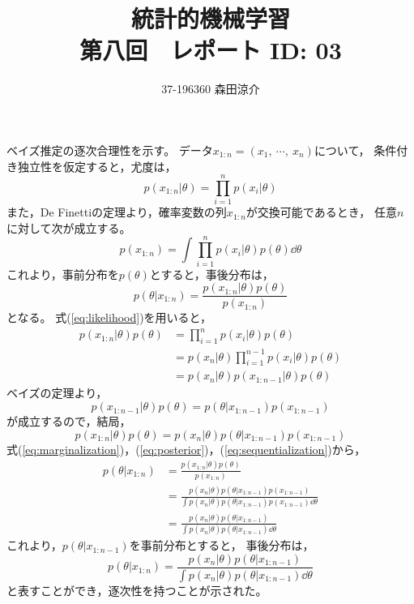 \documentclass[dvipdfmx, fleqn]{jsarticle}
\title{
	統計的機械学習 \\
    第八回　レポート ID: 03
    }
\author{37-196360 \quad 森田涼介}
\begin{document}
\maketitle

ベイズ推定の逐次合理性を示す。
データ\(x_{1:n} = (x_1,\ \cdots,\ x_n)\)について，
条件付き独立性を仮定すると，尤度は，
\begin{equation}
    p(x_{1:n}|\theta) = \prod_{i=1}^{n} p(x_i | \theta)
    \label{eq:likelihood}
\end{equation}
また，De Finettiの定理より，確率変数の列\(x_{1:n}\)が交換可能であるとき，
任意\(n\)に対して次が成立する。
\begin{equation}
    p(x_{1:n}) = \int \prod_{i=1}^{n} p(x_i | \theta) p(\theta) \dd\theta
    \label{eq:marginalization}
\end{equation}
これより，事前分布を\(p(\theta)\)とすると，事後分布は，
\begin{equation}
    p(\theta|x_{1:n}) = \frac{p(x_{1:n} | \theta) p(\theta)}{p(x_{1:n})}
    \label{eq:posterior}
\end{equation}
となる。
式(\ref{eq:likelihood})を用いると，
\begin{align*}
    p(x_{1:n} | \theta) p(\theta)
        & = \prod_{i=1}^{n} p(x_i | \theta) p(\theta) \\
        & = p(x_n | \theta) \prod_{i=1}^{n-1} p(x_i | \theta) p(\theta) \\
        & = p(x_n | \theta) p(x_{1:n-1} | \theta) p(\theta)
\end{align*}
ベイズの定理より，
\begin{equation*}
    p(x_{1:n-1} | \theta) p(\theta) = p(\theta | x_{1:n-1}) p(x_{1:n-1})
\end{equation*}
が成立するので，結局，
\begin{equation}
    p(x_{1:n} | \theta) p(\theta) = p(x_n | \theta) p(\theta | x_{1:n-1}) p(x_{1:n-1})
    \label{eq:sequentialization}
\end{equation}
式(\ref{eq:marginalization})，(\ref{eq:posterior})，(\ref{eq:sequentialization})から，
\begin{align*}
    p(\theta|x_{1:n})
        & = \frac{p(x_{1:n} | \theta) p(\theta)}{p(x_{1:n})} \\
        & = \frac{p(x_n | \theta) p(\theta | x_{1:n-1}) p(x_{1:n-1})}{\int p(x_n | \theta) p(\theta | x_{1:n-1}) p(x_{1:n-1}) \dd\theta} \\
        & = \frac{p(x_n | \theta) p(\theta | x_{1:n-1})}{\int p(x_n | \theta) p(\theta | x_{1:n-1}) \dd\theta}
\end{align*}
これより，\(p(\theta | x_{1:n-1})\)を事前分布とすると，
事後分布は，
\begin{equation}
    p(\theta|x_{1:n}) = \frac{p(x_n | \theta) p(\theta | x_{1:n-1})}{\int p(x_n | \theta) p(\theta | x_{1:n-1}) \dd\theta}
\end{equation}
と表すことができ，逐次性を持つことが示された。
\end{document}
